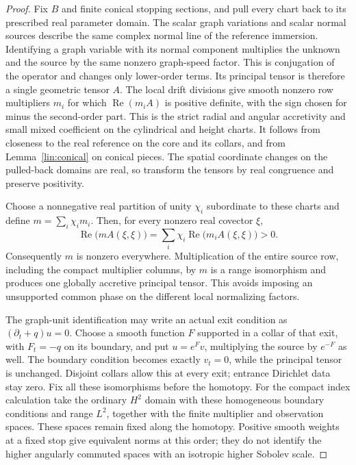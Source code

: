 \begin{proof}
Fix $B$ and finite conical stopping sections, and pull every chart
back to its prescribed real parameter domain. The scalar graph
variations and scalar normal sources describe the same complex
normal line of the reference immersion. Identifying a graph
variable with its normal component multiplies the unknown and
the source by the same nonzero graph-speed factor. This is
conjugation of the operator and changes only lower-order terms.
Its principal tensor is therefore a single geometric tensor $A$.
The local drift divisions give smooth nonzero row multipliers
$m_i$ for which $\operatorname{Re}(m_iA)$ is positive definite,
with the sign chosen for minus the second-order part. This is
the strict radial and angular accretivity and small mixed
coefficient on the cylindrical and height charts. It follows
from closeness to the real reference on the core and its collars,
and from Lemma~\ref{lin:conical} on conical pieces. The spatial
coordinate changes on the pulled-back domains are real, so
transform the tensors by real congruence and preserve positivity.

Choose a nonnegative real partition of unity $\chi_i$ subordinate
to these charts and define $m=\sum_i\chi_i m_i$. Then, for every
nonzero real covector $\xi$,
\[
 \operatorname{Re}\bigl(mA(\xi,\xi)\bigr)
 =\sum_i\chi_i\operatorname{Re}\bigl(m_iA(\xi,\xi)\bigr)>0.
\]
Consequently $m$ is nonzero everywhere. Multiplication of the
entire source row, including the compact multiplier columns, by
$m$ is a range isomorphism and produces one globally accretive
principal tensor. This avoids imposing an unsupported common
phase on the different local normalizing factors.

The graph-unit identification may write an actual exit condition
as $(\partial_t+q)u=0$. Choose a smooth function $F$ supported
in a collar of that exit, with $F_t=-q$ on its boundary, and put
$u=e^Fv$, multiplying the source by $e^{-F}$ as well. The
boundary condition becomes exactly $v_t=0$, while the principal
tensor is unchanged. Disjoint collars allow this at every exit;
entrance Dirichlet data stay zero. Fix all these isomorphisms
before the homotopy. For the compact index calculation take the
ordinary $H^2$ domain with these homogeneous boundary conditions
and range $L^2$, together with the finite multiplier and observation
spaces. These spaces remain fixed along the homotopy. Positive smooth
weights at a fixed stop give equivalent norms at this order; they
do not identify the higher angularly commuted spaces with an
isotropic higher Sobolev scale.


\end{proof}
